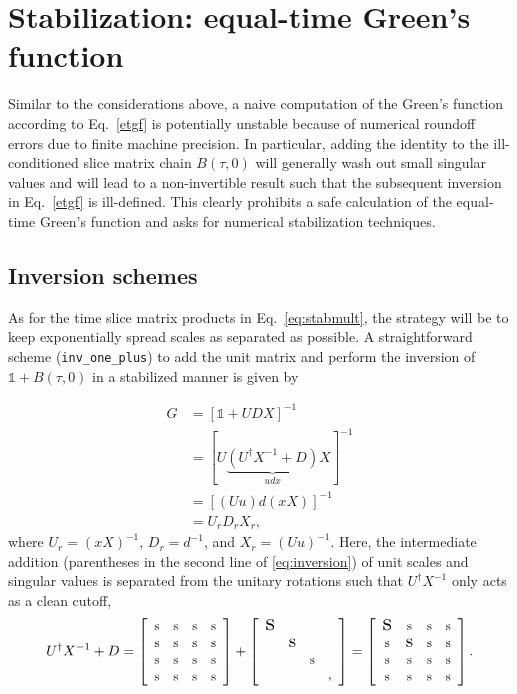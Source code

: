 \documentclass[submission, Phys]{SciPost}
\newcommand{\stiny}{\scalebox{0.5}{s}}
\newcommand{\ssmall}{\scalebox{0.9}{s}}
\newcommand{\smedium}{\scalebox{1.3}{s}}
\newcommand{\slarge}{\scalebox{1.7}{s}}
\newcommand{\U}{\left[
	\begin{array}{cccc}
		\ssmall & \ssmall & \ssmall & \ssmall \\
		\ssmall & \ssmall & \ssmall & \ssmall \\
		\ssmall & \ssmall & \ssmall & \ssmall \\
		\ssmall & \ssmall & \ssmall & \ssmall \\
	\end{array}
	\right]}
\newcommand{\D}{\left[
	\begin{array}{cccc}
		\slarge &  &  &  \\
		& \smedium &  &  \\
		&  & \ssmall &  \\
		&  &  & \stiny \\
	\end{array}
	\right]}
\begin{document}
\section{Stabilization: equal-time Green's function} \label{sec:etgf}

Similar to the considerations above, a naive computation of the Green's function according to Eq.~\eqref{etgf} is potentially unstable because of numerical roundoff errors due to finite machine precision. In particular, adding the identity to the ill-conditioned slice matrix chain $B(\tau, 0)$ will generally wash out small singular values and will lead to a non-invertible result such that the subsequent inversion in Eq.~\eqref{etgf} is ill-defined. This clearly prohibits a safe calculation of the equal-time Green’s function and asks for numerical stabilization techniques.

\subsection{Inversion schemes}
As for the time slice matrix products in Eq.~\eqref{eq:stabmult}, the strategy will be to keep exponentially spread scales as separated as possible. A straightforward scheme \cite{Santos2003, Assaad2002a} (\texttt{inv\_one\_plus}) to add the unit matrix and perform the inversion of $\mathbb{1} + B(\tau, 0)$ in a stabilized manner is given by

\begin{align}
	G &= [\mathbb{1} + UDX]^{-1} \nonumber \\
	&= [U\underbrace{(U^\dagger X^{-1} + D)}_{udx}X]^{-1} \nonumber\\
	&= [(Uu)d(xX)]^{-1} \label{eq:inversion}\\
	&= U_r D_r X_r \nonumber,
\end{align}
where $U_r = (xX)^{-1}$, $D_r = d^{-1}$, and $X_r = (Uu)^{-1}$. Here, the intermediate addition (parentheses in the second line of \eqref{eq:inversion}) of unit scales and singular values is separated from the unitary rotations such that $U^\dagger X^{-1}$ only acts as a clean cutoff,
\begin{align}
U^\dagger X^{-1} + D = \U + \D = \left[
\begin{array}{cccc}
\slarge & \ssmall & \ssmall & \ssmall \\
\ssmall & \smedium & \ssmall & \ssmall \\
\ssmall & \ssmall & \ssmall & \ssmall \\
\ssmall & \ssmall & \ssmall & \ssmall \\
\end{array}
\right].
\end{align}
\end{document}
